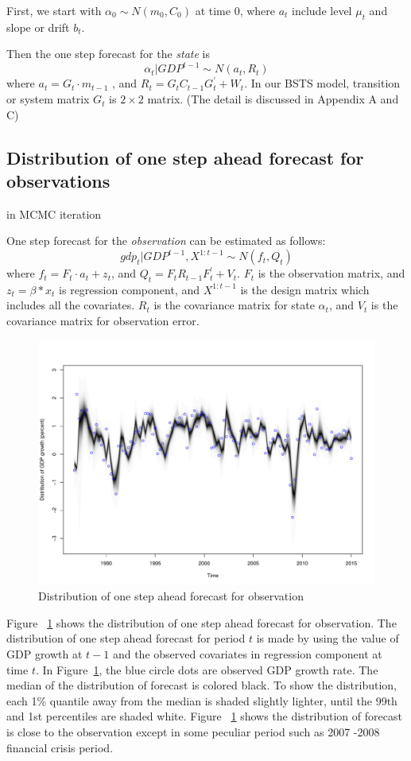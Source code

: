 First, we start with $ \alpha_0 \sim N(m_0, C_0) $ at time $0$, where $a_t$ include level $\mu_t$ and slope or drift $b_t$.

Then the one step forecast for the \textit{state} is
$$ \alpha_t|GDP^{t-1} \sim N(a_t, R_t) $$
where $a_t = G_t \cdot m_{t-1}$ , and $R_t = G_t C_{t-1} G_t^\prime + W_t$. In our BSTS model, transition or system matrix $G_t$ is $2 \times 2$ matrix. (The detail is discussed in Appendix A and C)  



\subsection{Distribution of one step ahead forecast for observations}

in MCMC iteration

One step forecast for the \textit{observation} can be estimated as follows: 
$$ gdp_t|GDP^{t-1}, X^{1:t-1}  \sim N(f_t, Q_t) $$
where $f_t = F_t \cdot a_t  + z_{t}$, and $Q_t = F_t R_{t-1} F_t^\prime + V_t$. $F_t$ is the observation matrix, and $z_{t} = \beta *  x_{t}$ is regression component, and  $X^{1:t-1}$ is the design matrix which includes all the covariates. $R_{t}$ is the covariance matrix for state $\alpha_{t}$, and $V_t$ is the covariance matrix for observation error.


\begin{figure}[h]
\centering
\includegraphics[width=0.6\linewidth]{Figures/forecast_distribution}
\caption{Distribution of one step ahead forecast for observation}
\label{fig:forecast_distribution}
\end{figure}



Figure  ~\ref{fig:forecast_distribution} shows the distribution of one step ahead forecast for observation. The distribution of one step ahead forecast for period $t$ is  made by using the value of GDP growth at $t-1$ and the observed covariates in regression component at time $t$. In Figure~\ref{fig:forecast_distribution}, the blue circle dots are observed GDP growth rate. The median of the distribution of forecast is colored black. To show the distribution, each 1\% quantile away from the median is shaded slightly lighter, until the 99th and 1st percentiles are shaded white. Figure  ~\ref{fig:forecast_distribution} shows the distribution of forecast is close to the observation except in some peculiar period such as 2007 -2008 financial crisis period.


